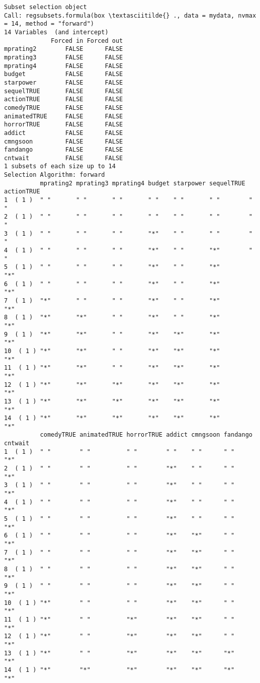 \documentclass[11pt]{article}
\begin{document}
    
    \begin{Verbatim}[commandchars=\\\{\}]
Subset selection object
Call: regsubsets.formula(box \textasciitilde{} ., data = mydata, nvmax = 14, method = "forward")
14 Variables  (and intercept)
             Forced in Forced out
mprating2        FALSE      FALSE
mprating3        FALSE      FALSE
mprating4        FALSE      FALSE
budget           FALSE      FALSE
starpower        FALSE      FALSE
sequelTRUE       FALSE      FALSE
actionTRUE       FALSE      FALSE
comedyTRUE       FALSE      FALSE
animatedTRUE     FALSE      FALSE
horrorTRUE       FALSE      FALSE
addict           FALSE      FALSE
cmngsoon         FALSE      FALSE
fandango         FALSE      FALSE
cntwait          FALSE      FALSE
1 subsets of each size up to 14
Selection Algorithm: forward
          mprating2 mprating3 mprating4 budget starpower sequelTRUE actionTRUE
1  ( 1 )  " "       " "       " "       " "    " "       " "        " "       
2  ( 1 )  " "       " "       " "       " "    " "       " "        " "       
3  ( 1 )  " "       " "       " "       "*"    " "       " "        " "       
4  ( 1 )  " "       " "       " "       "*"    " "       "*"        " "       
5  ( 1 )  " "       " "       " "       "*"    " "       "*"        "*"       
6  ( 1 )  " "       " "       " "       "*"    " "       "*"        "*"       
7  ( 1 )  "*"       " "       " "       "*"    " "       "*"        "*"       
8  ( 1 )  "*"       "*"       " "       "*"    " "       "*"        "*"       
9  ( 1 )  "*"       "*"       " "       "*"    "*"       "*"        "*"       
10  ( 1 ) "*"       "*"       " "       "*"    "*"       "*"        "*"       
11  ( 1 ) "*"       "*"       " "       "*"    "*"       "*"        "*"       
12  ( 1 ) "*"       "*"       "*"       "*"    "*"       "*"        "*"       
13  ( 1 ) "*"       "*"       "*"       "*"    "*"       "*"        "*"       
14  ( 1 ) "*"       "*"       "*"       "*"    "*"       "*"        "*"       
          comedyTRUE animatedTRUE horrorTRUE addict cmngsoon fandango cntwait
1  ( 1 )  " "        " "          " "        " "    " "      " "      "*"    
2  ( 1 )  " "        " "          " "        "*"    " "      " "      "*"    
3  ( 1 )  " "        " "          " "        "*"    " "      " "      "*"    
4  ( 1 )  " "        " "          " "        "*"    " "      " "      "*"    
5  ( 1 )  " "        " "          " "        "*"    " "      " "      "*"    
6  ( 1 )  " "        " "          " "        "*"    "*"      " "      "*"    
7  ( 1 )  " "        " "          " "        "*"    "*"      " "      "*"    
8  ( 1 )  " "        " "          " "        "*"    "*"      " "      "*"    
9  ( 1 )  " "        " "          " "        "*"    "*"      " "      "*"    
10  ( 1 ) "*"        " "          " "        "*"    "*"      " "      "*"    
11  ( 1 ) "*"        " "          "*"        "*"    "*"      " "      "*"    
12  ( 1 ) "*"        " "          "*"        "*"    "*"      " "      "*"    
13  ( 1 ) "*"        " "          "*"        "*"    "*"      "*"      "*"    
14  ( 1 ) "*"        "*"          "*"        "*"    "*"      "*"      "*"    
    \end{Verbatim}
\end{document}
